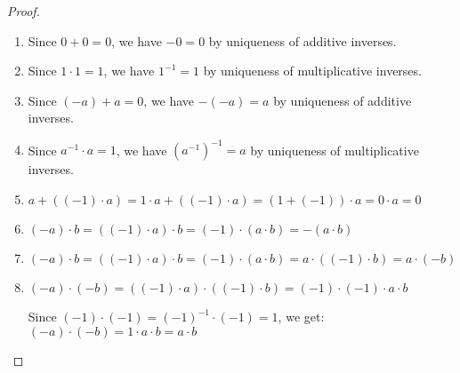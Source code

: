 \begin{proof}\
    \begin{enumerate}[label=(\roman*)]
        \item Since $0 + 0 = 0$, we have $-0 = 0$ by uniqueness of additive inverses.
        
        \item Since $1 \cdot 1 = 1$, we have $1^{-1} = 1$ by uniqueness of multiplicative inverses.
        
        \item Since $(-a) + a = 0$, we have $-(-a) = a$ by uniqueness of additive inverses.
        
        \item Since $a^{-1} \cdot a = 1$, we have $(a^{-1})^{-1} = a$ by uniqueness of multiplicative inverses.
        
        \item $a + ((-1) \cdot a) = 1 \cdot a + ((-1) \cdot a) = (1 + (-1)) \cdot a = 0 \cdot a = 0$
        
        \item $(-a) \cdot b = ((-1) \cdot a) \cdot b = (-1) \cdot (a \cdot b) = -(a \cdot b)$
        
        \item $(-a) \cdot b = ((-1) \cdot a) \cdot b = (-1) \cdot (a \cdot b) = a \cdot ((-1) \cdot b) = a \cdot (-b)$
        
        \item $(-a) \cdot (-b) = ((-1) \cdot a) \cdot ((-1) \cdot b) = (-1) \cdot (-1) \cdot a \cdot b$
        
        Since $(-1) \cdot (-1) = (-1)^{-1} \cdot (-1) = 1$, we get:
        $(-a) \cdot (-b) = 1 \cdot a \cdot b = a \cdot b$
    \end{enumerate}
\end{proof}